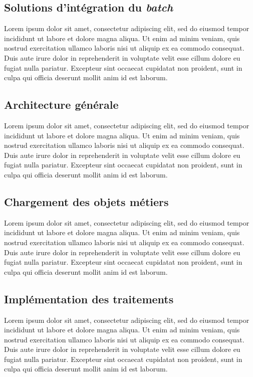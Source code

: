 \documentclass[a4paper, 12pt]{report}
\begin{document}
\subsection{Solutions d'intégration du \textit{batch}}

Lorem ipsum dolor sit amet, consectetur adipiscing elit, sed do eiusmod tempor incididunt ut labore et dolore magna aliqua. Ut enim ad minim veniam, quis nostrud exercitation ullamco laboris nisi ut aliquip ex ea commodo consequat. Duis aute irure dolor in reprehenderit in voluptate velit esse cillum dolore eu fugiat nulla pariatur. Excepteur sint occaecat cupidatat non proident, sunt in culpa qui officia deserunt mollit anim id est laborum.

\subsection{Architecture générale}

Lorem ipsum dolor sit amet, consectetur adipiscing elit, sed do eiusmod tempor incididunt ut labore et dolore magna aliqua. Ut enim ad minim veniam, quis nostrud exercitation ullamco laboris nisi ut aliquip ex ea commodo consequat. Duis aute irure dolor in reprehenderit in voluptate velit esse cillum dolore eu fugiat nulla pariatur. Excepteur sint occaecat cupidatat non proident, sunt in culpa qui officia deserunt mollit anim id est laborum.

\subsection{Chargement des objets métiers}

Lorem ipsum dolor sit amet, consectetur adipiscing elit, sed do eiusmod tempor incididunt ut labore et dolore magna aliqua. Ut enim ad minim veniam, quis nostrud exercitation ullamco laboris nisi ut aliquip ex ea commodo consequat. Duis aute irure dolor in reprehenderit in voluptate velit esse cillum dolore eu fugiat nulla pariatur. Excepteur sint occaecat cupidatat non proident, sunt in culpa qui officia deserunt mollit anim id est laborum.

\subsection{Implémentation des traitements}

Lorem ipsum dolor sit amet, consectetur adipiscing elit, sed do eiusmod tempor incididunt ut labore et dolore magna aliqua. Ut enim ad minim veniam, quis nostrud exercitation ullamco laboris nisi ut aliquip ex ea commodo consequat. Duis aute irure dolor in reprehenderit in voluptate velit esse cillum dolore eu fugiat nulla pariatur. Excepteur sint occaecat cupidatat non proident, sunt in culpa qui officia deserunt mollit anim id est laborum.
\end{document}
